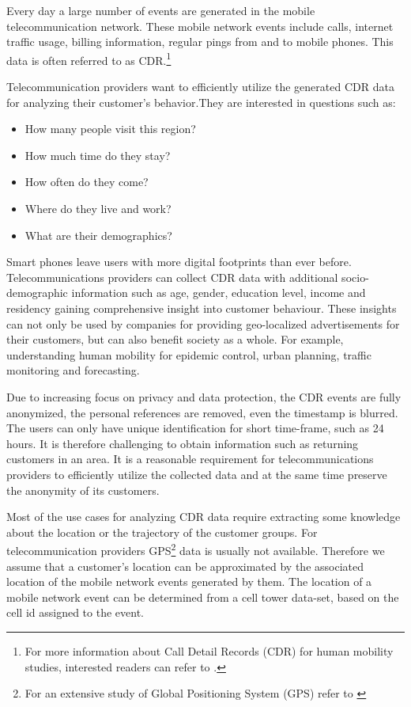 Every day a large number of events are generated in the mobile telecommunication network. These mobile network events include calls, internet traffic usage, billing information, regular pings from and to mobile phones. This data is often referred to as CDR.\footnote{For more
information about Call Detail Records (CDR) for human mobility studies, interested readers can refer to \cite{spatiotemp}.} 

Telecommunication providers want to efficiently utilize the generated CDR data for analyzing their customer's behavior.They are interested in questions such as:
\begin{itemize}
\item How many people visit this region?
\item How much time do they stay?
\item How often do they come?
\item Where do they live and work?
\item What are their demographics?
\end{itemize}

Smart phones leave users with more digital footprints than ever before. Telecommunications providers can collect CDR data with additional socio-demographic information such as age, gender, education level, income and residency gaining comprehensive insight into customer behaviour. These insights can not only be used by companies for providing geo-localized advertisements for their customers, but can also benefit society as a whole. For example, understanding human mobility for epidemic control, urban planning, traffic monitoring and forecasting.

Due to increasing focus on privacy and data protection, the CDR events are fully anonymized, the personal references are removed, even the timestamp is blurred. The users can only have unique identification for short time-frame, such as 24 hours. It is therefore challenging to obtain information such as returning customers in an area. It is a reasonable requirement for telecommunications providers to efficiently utilize the collected data and at the same time preserve the anonymity of its customers. 

Most of the use cases for analyzing CDR data require extracting some knowledge about the location or the trajectory of the customer groups. For telecommunication providers GPS\footnote{For an extensive study of Global Positioning System (GPS) refer to \cite{gps}} data is usually not available. Therefore we assume that a customer's location can be approximated by the associated location of the mobile network events generated by them. The location of a mobile network event can be determined from a cell tower data-set, based on the cell id assigned to the event.

